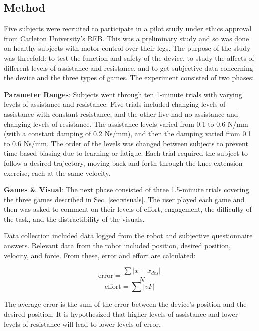 \documentclass[12pt]{report}
\begin{document}
	
	
		\subsection{Method}
		
		Five subjects were recruited to participate in a pilot study under ethics approval from Carleton University's REB. This was a preliminary study and so was done on healthy subjects with motor control over their legs. The purpose of the study was threefold: to test the function and safety of the device, to study the affects of different levels of assistance and resistance, and to get subjective data concerning the device and the three types of games. The experiment consisted of two phases: 

\textbf{Parameter Ranges}: Subjects went through ten 1-minute trials with varying levels of assistance and resistance. Five trials included changing levels of assistance with constant resistance, and the other five had no assistance and changing levels of resistance. The assistance levels varied from 0.1 to 0.6 N/mm (with a constant damping of 0.2 Ns/mm), and then the damping varied from 0.1 to 0.6 Ns/mm. The order of the levels was changed between subjects to prevent time-based biasing due to learning or fatigue. Each trial required the subject to follow a desired trajectory, moving back and forth through the knee extension exercise, each at the same velocity. 

\textbf{Games \& Visual}: The next phase consisted of three 1.5-minute trials covering the three games described in Sec. \ref{sec:visuals}. The user played each game and then was asked to comment on their levels of effort, engagement, the difficulty of the task, and the distractibility of the visuals. 

Data collection included data logged from the robot and subjective questionnaire answers. Relevant data from the robot included position, desired position, velocity, and force. From these, error and effort are calculated:

\begin{equation}
\text{error} = \frac{\sum |x - x_{des}|}{N}
\end{equation}
\begin{equation}
\text{effort} = \sum |vF|
\end{equation}

The average error is the sum of the error between the device's position and the desired position. It is hypothesized that higher levels of assistance and lower levels of resistance will lead to lower levels of error. 
\end{document}
